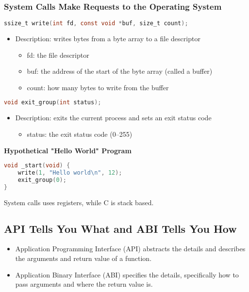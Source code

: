 \subsubsection{System Calls Make Requests to the Operating System}
\begin{definition}
\begin{lstlisting}[language=C]
ssize_t write(int fd, const void *buf, size_t count);
\end{lstlisting}
\begin{itemize}
    \item Description: writes bytes from a byte array to a file descriptor
    \begin{itemize}
        \item fd: the file descriptor
        \item buf: the address of the start of the byte array (called a buffer)
        \item count: how many bytes to write from the buffer
    \end{itemize}
\end{itemize}

\begin{lstlisting}[language=C]
void exit_group(int status);
\end{lstlisting}

\begin{itemize}
    \item Description: exits the current process and sets an exit status code
    \begin{itemize}
        \item status: the exit status code (0–255)
    \end{itemize}
\end{itemize}  
\end{definition}

\begin{example}
    \textbf{Hypothetical "Hello World" Program}
\begin{lstlisting}[language=C]
void _start(void) {
    write(1, "Hello world\n", 12);
    exit_group(0);
}
\end{lstlisting}
\end{example}

\begin{warning}
    System calls uses registers, while C is stack based.
\end{warning}

\subsection{API Tells You What and ABI Tells You How}
\begin{definition}
    \begin{itemize}
        \item Application Programming Interface (API) abstracts the details and describes the arguments and return value of a function.
        \item Application Binary Interface (ABI) specifies the details, specifically how to pass arguments and where the return value is.
    \end{itemize}
\end{definition}

